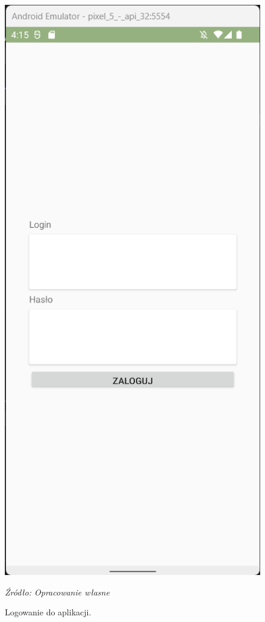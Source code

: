 \documentclass[12pt,oneside]{report}
\begin{document}
\begin{figure}
	\centering
	\includegraphics[scale=0.35]{LoginView}
	\caption{\centering Logowanie do aplikacji.}
	\textit{\centering Źródło: Opracowanie własne}
	\label{LoginView}
	\newline
	\newline

\end{figure}
\end{document}
